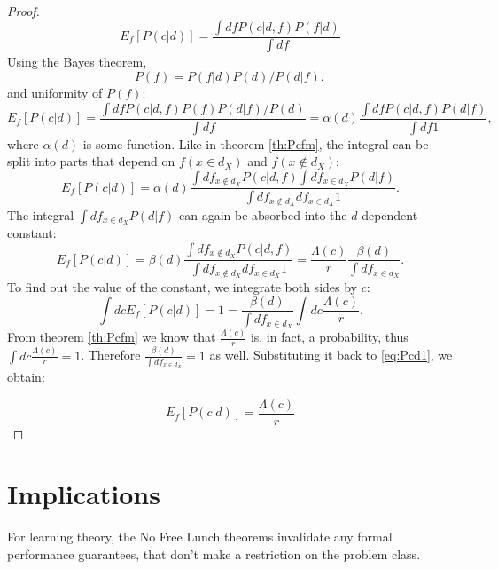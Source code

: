 \documentclass[a4paper]{article}
\begin{document}
\begin{proof}
  \begin{equation}
    E_f\left[P(c|d)\right] = \frac{\int df P(c|d,f) P(f|d)}{\int df}
  \end{equation}
  Using the Bayes theorem,
  \begin{equation}
    P(f) =  P(f|d) P(d) / P(d|f),
  \end{equation}
  and uniformity of $P(f)$:
  \begin{equation}
    E_f\left[P(c|d)\right] = \frac{\int df P(c|d,f) P(f) P(d|f) / P(d)}{\int df} = \alpha(d)
      \frac{\int df P(c|d,f) P(d|f)}{\int df 1},
  \end{equation}
  where $\alpha(d)$ is some function. Like in theorem \ref{th:Pcfm},
  the integral can be split into parts that depend on
  $f\left(x\in d_X\right)$ and $f\left(x\notin d_X\right)$:
  \begin{equation}
    E_f\left[P(c|d)\right] = \alpha(d) \frac{\int df_{x\notin d_X} P\left(c|d,f \right)
      \int df_{x \in d_X} P\left(d|f\right)}{\int df_{x\notin d_X} df_{x \in d_X} 1}.
  \end{equation}
  The integral $\int df_{x \in d_X} P\left(d|f\right)$ can again be
  absorbed into the $d$-dependent constant:
  \begin{equation}
    E_f\left[P(c|d)\right] = \beta(d) \frac{\int df_{x\notin d_X} P\left(c|d,f \right)
    }{\int df_{x\notin d_X} df_{x \in d_X} 1} = \frac{\Lambda(c)}{r} \frac{\beta(d)}{\int df_{x \in d_X}}.
    \label{eq:Pcd1}
  \end{equation}
  To find out the value of the constant, we integrate both sides by $c$:
  \begin{equation}
    \int dc E_f\left[P(c|d)\right] = 1 = \frac{\beta(d)}{\int df_{x \in d_X}}
    \int dc \frac{\Lambda(c)}{r}.
  \end{equation}
  From theorem \ref{th:Pcfm} we know that $\frac{\Lambda(c)}{r}$ is,
  in fact, a probability, thus $\int dc \frac{\Lambda(c)}{r} =
  1$. Therefore $\frac{\beta(d)}{\int df_{x \in d_X}} = 1$ as
  well. Substituting it back to \ref{eq:Pcd1}, we obtain:
  
  \begin{equation}
    E_f\left[P(c|d)\right] =  \frac{\Lambda(c)}{r}
  \end{equation}
\end{proof}

\section{Implications}
For learning theory, the No Free Lunch theorems invalidate any formal
performance guarantees, that don't make a restriction on the problem
class.
\end{document}

